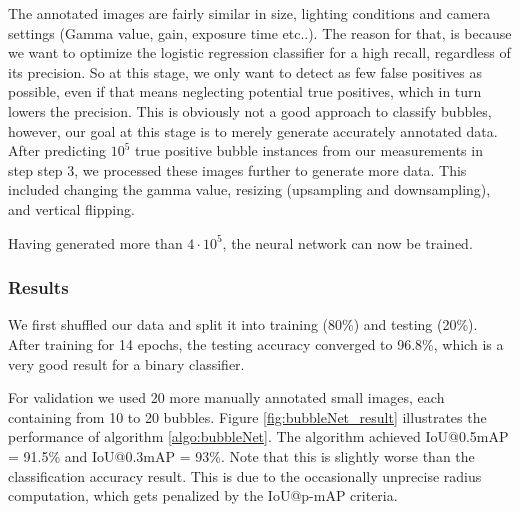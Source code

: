 			The annotated images are fairly similar in size, lighting conditions and camera settings (Gamma value, gain, exposure time etc..). The reason for that, is because we want to optimize the logistic regression classifier for a high recall, regardless of its precision. So at this stage, we only want to detect as few false positives as possible, even if that means neglecting potential true positives, which in turn lowers the precision. This is obviously not a good approach to classify bubbles, however, our goal at this stage is to merely generate accurately annotated data. After predicting $10^5$ true positive bubble instances from our measurements in step step 3, we processed these images further to generate more data. This included changing the gamma value, resizing (upsampling and downsampling), and vertical flipping. 
			
			Having generated more than $4 \cdot 10^5$, the neural network can now be trained. 
			
			
			
			


			
		\subsubsection{Results}
			
			We first shuffled our data and split it into training (80\%) and testing (20\%). After training for 14 epochs, the testing accuracy converged to 96.8\%, which is a very good result for a binary classifier. 
			
			For validation we used 20 more manually annotated small images, each containing from 10 to 20 bubbles. Figure \ref{fig:bubbleNet_result} illustrates the performance of algorithm \ref{algo:bubbleNet}.  
			The algorithm achieved IoU@0.5mAP = 91.5\% and IoU@0.3mAP = 93\%. Note that this is slightly worse than the classification accuracy result. This is due to the occasionally unprecise radius computation, which gets penalized by the IoU@p-mAP criteria. 
	
